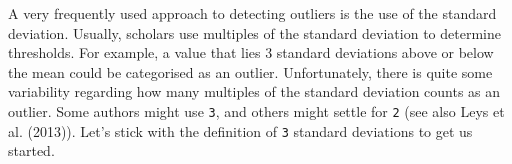\documentclass[
  letterpaper,
]{krantz}
\makeatletter
\newenvironment{Shaded}{\begin{snugshade}}{\end{snugshade}}
\newcommand{\AttributeTok}[1]{\textcolor[rgb]{0.40,0.45,0.13}{#1}}
\newcommand{\CommentTok}[1]{\textcolor[rgb]{0.37,0.37,0.37}{#1}}
\newcommand{\ConstantTok}[1]{\textcolor[rgb]{0.56,0.35,0.01}{#1}}
\newcommand{\DecValTok}[1]{\textcolor[rgb]{0.68,0.00,0.00}{#1}}
\newcommand{\FunctionTok}[1]{\textcolor[rgb]{0.28,0.35,0.67}{#1}}
\newcommand{\NormalTok}[1]{\textcolor[rgb]{0.00,0.23,0.31}{#1}}
\newcommand{\OtherTok}[1]{\textcolor[rgb]{0.00,0.23,0.31}{#1}}
\newcommand{\SpecialCharTok}[1]{\textcolor[rgb]{0.37,0.37,0.37}{#1}}
\newcommand{\StringTok}[1]{\textcolor[rgb]{0.13,0.47,0.30}{#1}}
\newenvironment{kframe}{%
\medskip{}
\setlength{\fboxsep}{.8em}
 \def\at@end@of@kframe{}%
 \ifinner\ifhmode%
  \def\at@end@of@kframe{\end{minipage}}%
  \begin{minipage}{\columnwidth}%
 \fi\fi%
 \def\FrameCommand##1{\hskip\@totalleftmargin \hskip-\fboxsep
 \colorbox{shadecolor}{##1}\hskip-\fboxsep
     \hskip-\linewidth \hskip-\@totalleftmargin \hskip\columnwidth}%
 \MakeFramed {\advance\hsize-\width
   \@totalleftmargin\z@ \linewidth\hsize
   \@setminipage}}%
 {\par\unskip\endMakeFramed%
 \at@end@of@kframe}
\renewenvironment{Shaded}{\begin{kframe}}{\end{kframe}}
\makeatother
\begin{document}
A very frequently used approach to detecting outliers is the use of the
standard deviation. Usually, scholars use multiples of the standard
deviation to determine thresholds. For example, a value that lies 3
standard deviations above or below the mean could be categorised as an
outlier. Unfortunately, there is quite some variability regarding how
many multiples of the standard deviation counts as an outlier. Some
authors might use \texttt{3}, and others might settle for \texttt{2}
(see also Leys et al. (2013)). Let's stick with the definition of
\texttt{3} standard deviations to get us started.

\begin{Shaded}
\end{Shaded}
\end{document}
